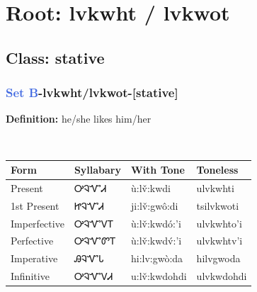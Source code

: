 \needspace{4in}
\section*{Root: lvkwht / lvkwot}
\nopagebreak
{}
\needspace{3in}
\subsection*{Class: stative}
\nopagebreak
\needspace{2in}
\subsubsection*{\textcolor{RoyalBlue}{Set B}{-}\textbf{lvkwht/lvkwot}{-}[stative]}
\nopagebreak
\textbf{Definition: } he/she likes him/her
\\[0.5em]
\begin{tabularx}{\textwidth}{l X X X}%
\toprule%
\textbf{Form}&\textbf{Syllabary}&\textbf{With Tone}&\textbf{Toneless}\\%
\midrule%
Present&ᎤᎸᏉᏗ&ù:lv̌:kwdi&ulvkwhti\\%
1st Present&ᏥᎸᏉᏗ&ji:lv̌:gwô:di&tsilvkwoti\\%
Imperfective&ᎤᎸᏉᏙᎢ&ù:lv̌:kwdó:’i&ulvkwhto'i\\%
Perfective&ᎤᎸᏉᏛᎢ&ù:lv̌:kwdv́:’i&ulvkwhtv'i\\%
Imperative&ᎯᎸᏉᏓ&hi:lv:gwò:da&hilvgwoda\\%
Infinitive&ᎤᎸᏉᏙᏗ&u:lv̌:kwdohdi&ulvkwdohdi\\%
\bottomrule%
\end{tabularx}
\\[1em]